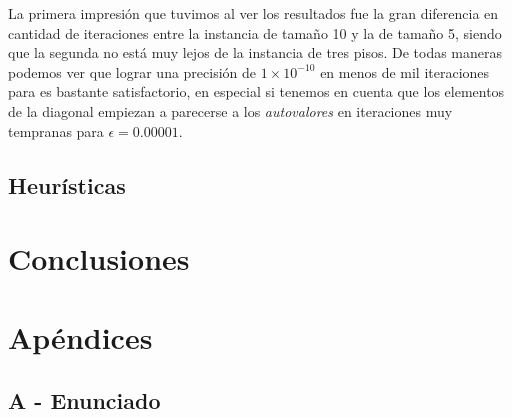 \documentclass[a4paper]{article}
\begin{document}
La primera impresión que tuvimos al ver los resultados fue la gran diferencia en cantidad de iteraciones entre la instancia de tamaño 10 y la de tamaño 5, siendo que la segunda no está muy lejos de la instancia de tres pisos. De todas maneras podemos ver que lograr una precisión de $1\times 10^{-10}$ en menos de mil iteraciones para es bastante satisfactorio, en especial si tenemos en cuenta que los elementos de la diagonal empiezan a parecerse a los \textit{autovalores} en iteraciones muy tempranas para $\epsilon = 0.00001$.

\subsection{Heurísticas}



\newpage

\section{Conclusiones}

\newpage

\section{Apéndices}
\subsection{A - Enunciado}
\end{document}
